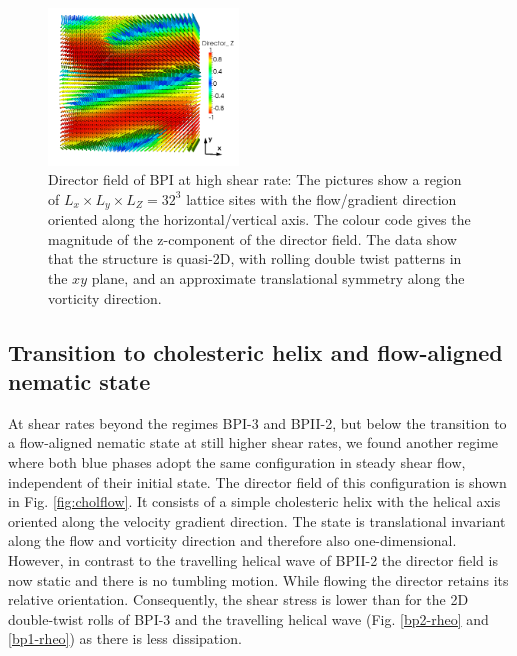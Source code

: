 \documentclass[aps,pre,reprint,superscriptaddress, twocolumn]{revtex4}
\begin{document}
\begin{figure}[htpb]
\includegraphics[width=0.45\textwidth]{dir3d-z-302k_run916.png}
\caption{Director field of BPI at high shear rate: The pictures show a region 
of $L_x\times L_y \times L_Z= 32^3$ lattice sites with the flow/gradient 
direction oriented along the horizontal/vertical axis. 
The colour code gives the magnitude of the z-component of the director field. 
The data show that the structure is quasi-2D, with rolling double twist
patterns in the $xy$ plane, and an approximate translational symmetry 
along the vorticity direction.}
\label{bp1-high}
\end{figure}

\subsection{Transition to cholesteric helix and flow-aligned nematic state}\label{cholflow}


At shear rates beyond the regimes BPI-3 and BPII-2, but below the transition to a 
flow-aligned nematic state at still higher shear rates, we found another regime where 
both blue phases adopt the same configuration in steady shear flow, 
independent of their initial state.
The director field of this configuration is shown in Fig. \ref{fig:cholflow}.
It consists of a simple cholesteric helix with the helical axis oriented 
along the velocity gradient direction. The state is translational invariant 
along the flow and vorticity direction and therefore also one-dimensional. 
However, in contrast to the travelling helical wave of BPII-2 the 
director field is now static and there is no tumbling motion. 
While flowing the director retains its relative orientation.
Consequently, the shear stress is lower than for
the 2D double-twist rolls of BPI-3 and the travelling helical wave
(Fig. \ref{bp2-rheo} and \ref{bp1-rheo}) as there is less dissipation.
 
\end{document}

